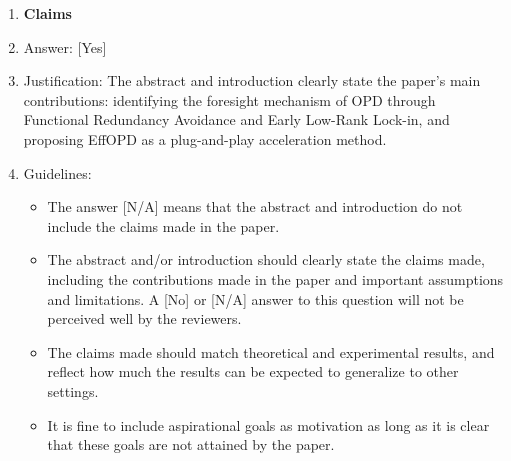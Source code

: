\documentclass{llmxive}
\providecommand{\answerYes}[1][]{[Yes]#1}
\providecommand{\answerNo}[1][]{[No]#1}
\providecommand{\answerNA}[1][]{[N/A]#1}
\begin{document}
\begin{enumerate}
\item {\bf Claims}
    \item[] Answer: \answerYes{}
    \item[] Justification: The abstract and introduction clearly state the paper's main contributions: identifying the foresight mechanism of OPD through Functional Redundancy Avoidance and Early Low-Rank Lock-in, and proposing EffOPD as a plug-and-play acceleration method.
    \item[] Guidelines:
    \begin{itemize}
        \item The answer \answerNA{} means that the abstract and introduction do not include the claims made in the paper.
        \item The abstract and/or introduction should clearly state the claims made, including the contributions made in the paper and important assumptions and limitations. A \answerNo{} or \answerNA{} answer to this question will not be perceived well by the reviewers. 
        \item The claims made should match theoretical and experimental results, and reflect how much the results can be expected to generalize to other settings. 
        \item It is fine to include aspirational goals as motivation as long as it is clear that these goals are not attained by the paper. 
    \end{itemize}


\end{enumerate}
\end{document}
